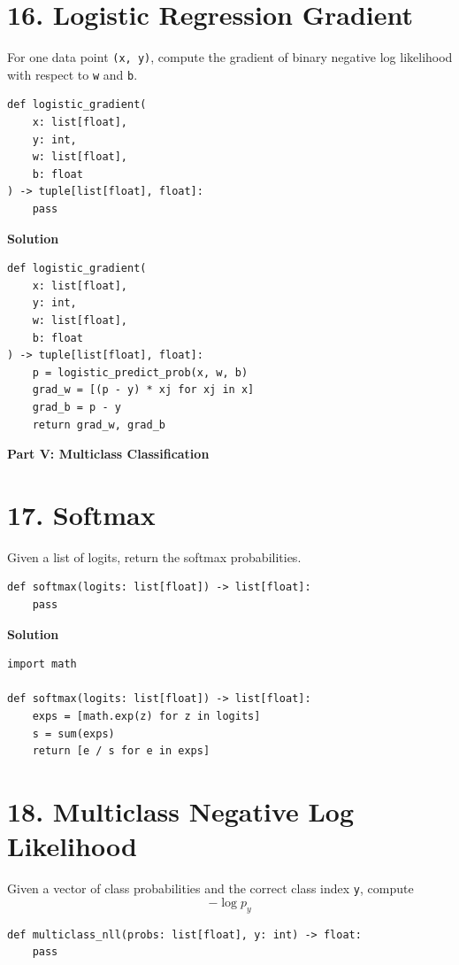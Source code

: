 \documentclass[11pt]{article}
\begin{document}
\section*{16. Logistic Regression Gradient}
For one data point \texttt{(x, y)}, compute the gradient of binary negative log likelihood with respect to \texttt{w} and \texttt{b}.

\begin{lstlisting}
def logistic_gradient(
    x: list[float],
    y: int,
    w: list[float],
    b: float
) -> tuple[list[float], float]:
    pass
\end{lstlisting}

\medskip
\noindent\textbf{Solution}
\begin{lstlisting}
def logistic_gradient(
    x: list[float],
    y: int,
    w: list[float],
    b: float
) -> tuple[list[float], float]:
    p = logistic_predict_prob(x, w, b)
    grad_w = [(p - y) * xj for xj in x]
    grad_b = p - y
    return grad_w, grad_b
\end{lstlisting}

\vspace{0.75em}
\noindent\textbf{\large Part V: Multiclass Classification}
\vspace{0.5em}

\section*{17. Softmax}
Given a list of logits, return the softmax probabilities.

\begin{lstlisting}
def softmax(logits: list[float]) -> list[float]:
    pass
\end{lstlisting}

\medskip
\noindent\textbf{Solution}
\begin{lstlisting}
import math

def softmax(logits: list[float]) -> list[float]:
    exps = [math.exp(z) for z in logits]
    s = sum(exps)
    return [e / s for e in exps]
\end{lstlisting}

\section*{18. Multiclass Negative Log Likelihood}
Given a vector of class probabilities and the correct class index \texttt{y}, compute
\[
-\log p_y
\]

\begin{lstlisting}
def multiclass_nll(probs: list[float], y: int) -> float:
    pass
\end{lstlisting}
\end{document}
